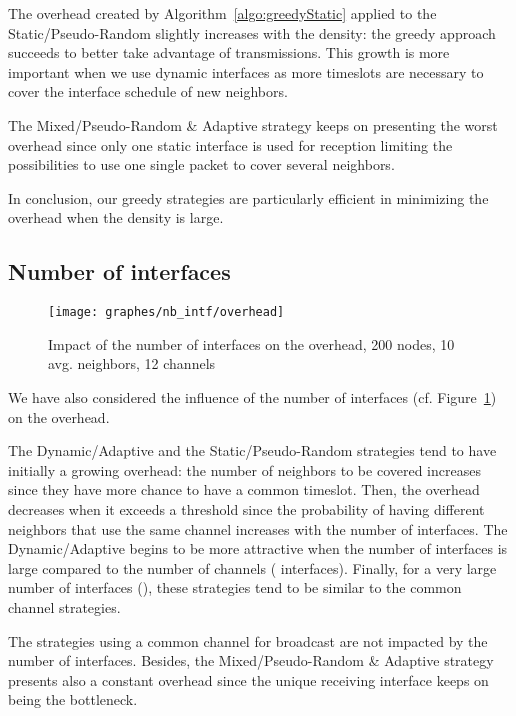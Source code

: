 \documentclass[twoside]{article}
\begin{document}
{The overhead created by Algorithm~\ref{algo:greedyStatic} applied to the
Static/Pseudo-Random slightly increases with the density: the greedy approach
succeeds to better take advantage of transmissions.
This growth is more important when we use dynamic interfaces as more timeslots are necessary to cover the interface schedule of new neighbors.


The Mixed/Pseudo-Random \& Adaptive strategy keeps on presenting the worst overhead since only one static interface is used for reception limiting the possibilities to use one single packet to cover several neighbors.



In conclusion, our greedy strategies are particularly efficient in minimizing the overhead when the density is large.




\subsection{Number of interfaces}
\begin{figure}
\begin{center}
	\texttt{[image: graphes/nb\_intf/overhead]}
	\caption{Impact of the number of interfaces on the overhead, 200 nodes, 10 avg. neighbors, 12 channels}
	\label{fig:nbint_overhead}
\end{center}
\end{figure}

We have also considered the influence of the number of interfaces (cf. Figure~\ref{fig:nbint_overhead}) on the overhead. 

The Dynamic/Adaptive and the Static/Pseudo-Random  strategies tend to have initially a growing overhead: the number of neighbors to be covered increases since they have more chance to have a common timeslot.
Then, the overhead decreases when it exceeds a threshold since the probability of having different neighbors that use the same channel increases with the number of interfaces.
The Dynamic/Adaptive begins to be more attractive when the number of interfaces is large compared to the number of channels ( interfaces).
Finally, for a very large number of interfaces (), these strategies tend to be similar to the common channel strategies. 

The strategies using a common channel for broadcast are not impacted by the number of interfaces. 
Besides, the Mixed/Pseudo-Random \& Adaptive strategy presents also a constant overhead since the unique receiving interface keeps on being the bottleneck. 




}
\end{document}
